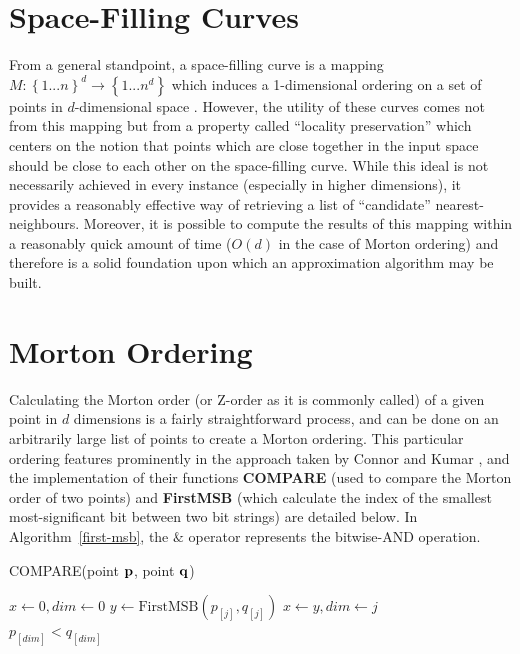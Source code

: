 \documentclass[10pt]{article}
\begin{document}
\section{Space-Filling Curves}

From a general standpoint, a space-filling curve is a mapping $M : \left\{ {1 ... n} \right\}^d \rightarrow \left\{ {1 ... n^d} \right\}$ which induces a 1-dimensional ordering on a set of points in $d$-dimensional space \cite{Bader:2013}. However, the utility of these curves comes not from this mapping but from a property called ``locality preservation'' which centers on the notion that points which are close together in the input space should be close to each other on the space-filling curve. While this ideal is not necessarily achieved in every instance (especially in higher dimensions), it provides a reasonably effective way of retrieving a list of ``candidate'' nearest-neighbours. Moreover, it is possible to compute the results of this mapping within a reasonably quick amount of time ($O(d)$ in the case of Morton ordering) and therefore is a solid foundation upon which an approximation algorithm may be built.

\section{Morton Ordering}

Calculating the Morton order (or Z-order as it is commonly called) of a given point in $d$ dimensions is a fairly straightforward process, and can be done on an arbitrarily large list of points to create a Morton ordering. This particular ordering features prominently in the approach taken by Connor and Kumar \cite{Connor:2010}, and the implementation of their functions {\bf COMPARE} (used to compare the Morton order of two points) and {\bf FirstMSB} (which calculate the index of the smallest most-significant bit between two bit strings) are detailed below. In Algorithm~\ref{first-msb}, the $\mathrel{\&}$ operator represents the bitwise-AND operation.

\begin{algorithm}
  \caption{COMPARE(point ${\bf p}$, point ${\bf q}$)}
  \label{compare}
  \begin{algorithmic}[1]
    \State $x \leftarrow 0, dim \leftarrow 0$
    \State $y \leftarrow \text{FirstMSB}(p_{[j]}, q_{[j]})$
    \State $x \leftarrow y, dim \leftarrow j$
    \EndIf 
    \EndFor \\
    \Return $p_{[dim]} < q_{[dim]}$
  \end{algorithmic}
\end{algorithm}
\end{document}

